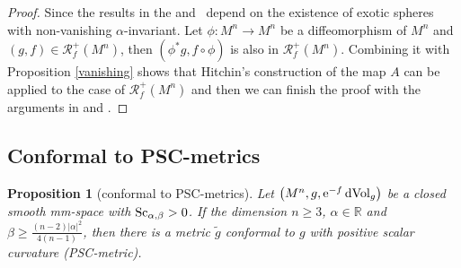 \documentclass[10pt,a4paper]{amsart}
\newtheorem{Proposition}[Theorem]{Proposition}
\begin{document}
\begin{proof}Since the results in the \cite[Section~4.4]{MR358873} and~\cite{MR3073935}
depend on the existence of exotic spheres with non-vanishing $\alpha$-invariant. Let $\phi\colon M^n\to M^n$ be a diffeomorphism of $M^n$ and $(g, f)\in \mathcal{R}^+_f(M^n)$, then $(\phi^*g, f\circ\phi)$ is also in $\mathcal{R}^+_f(M^n)$. Combining it with Proposition \ref{vanishing} shows that Hitchin's construction of the map $A$ \cite[Proposition~4.6]{MR358873} can be applied to the case of $\mathcal{R}^+_f(M^n)$ and then we can finish the proof with the arguments in \cite[Section~4.4]{MR358873} and \cite[Section~2.5]{MR3073935}.
\end{proof}

\subsection{Conformal to PSC-metrics}

\begin{Proposition}[conformal to PSC-metrics]\label{Conformal}
Let $\big(M^n, g, {\rm e}^{-f}\,{\rm dVol}_g\big)$ be a closed smooth mm-space with ${\rm Sc}_{\alpha, \beta} > 0$. If the dimension $n\geq 3$, $\alpha \in \mathbb{R}$ and $\beta \geq \frac{(n-2)|\alpha|^2}{4(n-1)}$, then there is a metric $\tilde{g}$ conformal to $g$ with positive scalar curvature (PSC-metric).
\end{Proposition}
\end{document}
